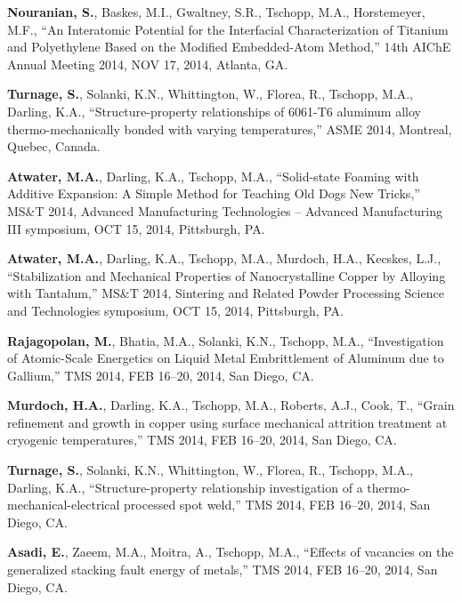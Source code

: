 \begin{cvlist}
\item
\textbf{Nouranian, S.}, Baskes, M.I., Gwaltney, S.R., Tschopp, M.A., Horstemeyer, M.F., ``An Interatomic Potential for the Interfacial Characterization of Titanium and Polyethylene Based on the Modified Embedded-Atom Method,'' 14th AIChE Annual Meeting 2014, NOV 17, 2014, Atlanta, GA.

\item
\textbf{Turnage, S.}, Solanki, K.N., Whittington, W., Florea, R., Tschopp, M.A., Darling, K.A., ``Structure-property relationships of 6061-T6 aluminum alloy thermo-mechanically bonded with varying temperatures,'' ASME 2014, Montreal, Quebec, Canada.

\item
\textbf{Atwater, M.A.}, Darling, K.A., Tschopp, M.A., ``Solid-state Foaming with Additive Expansion: A Simple Method for Teaching Old Dogs New Tricks,'' MS\&T 2014, Advanced Manufacturing Technologies -- Advanced Manufacturing III symposium, OCT 15, 2014, Pittsburgh, PA.

\item
\textbf{Atwater, M.A.}, Darling, K.A., Tschopp, M.A., Murdoch, H.A., Kecskes, L.J., ``Stabilization and Mechanical Properties of Nanocrystalline Copper by Alloying with Tantalum,'' MS\&T 2014, Sintering and Related Powder Processing Science and Technologies symposium, OCT 15, 2014, Pittsburgh, PA.

\item
\textbf{Rajagopolan, M.}, Bhatia, M.A., Solanki, K.N., Tschopp, M.A., ``Investigation of Atomic-Scale Energetics on Liquid Metal Embrittlement of Aluminum due to Gallium,'' TMS 2014, FEB 16--20, 2014, San Diego, CA.

\item
\textbf{Murdoch, H.A.}, Darling, K.A., Tschopp, M.A., Roberts, A.J., Cook, T., ``Grain refinement and growth in copper using surface mechanical attrition treatment at cryogenic temperatures,''  TMS 2014, FEB 16--20, 2014, San Diego, CA.

\item
\textbf{Turnage, S.}, Solanki, K.N., Whittington, W., Florea, R., Tschopp, M.A., Darling, K.A., ``Structure-property relationship investigation of a thermo-mechanical-electrical processed spot weld,'' TMS 2014, FEB 16--20, 2014, San Diego, CA.

\item
\textbf{Asadi, E.}, Zaeem, M.A., Moitra, A., Tschopp, M.A., ``Effects of vacancies on the generalized stacking fault energy of metals,'' TMS 2014, FEB 16--20, 2014, San Diego, CA.


\end{cvlist}
